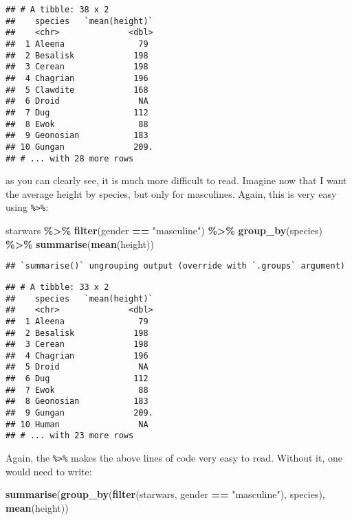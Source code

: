 \documentclass[
]{article}
\newenvironment{Shaded}{\begin{snugshade}}{\end{snugshade}}
\newcommand{\KeywordTok}[1]{\textcolor[rgb]{0.13,0.29,0.53}{\textbf{#1}}}
\newcommand{\NormalTok}[1]{#1}
\newcommand{\OperatorTok}[1]{\textcolor[rgb]{0.81,0.36,0.00}{\textbf{#1}}}
\newcommand{\StringTok}[1]{\textcolor[rgb]{0.31,0.60,0.02}{#1}}
\begin{document}
\begin{verbatim}
## # A tibble: 38 x 2
##    species   `mean(height)`
##    <chr>              <dbl>
##  1 Aleena               79 
##  2 Besalisk            198 
##  3 Cerean              198 
##  4 Chagrian            196 
##  5 Clawdite            168 
##  6 Droid                NA 
##  7 Dug                 112 
##  8 Ewok                 88 
##  9 Geonosian           183 
## 10 Gungan              209.
## # ... with 28 more rows
\end{verbatim}

as you can clearly see, it is much more difficult to read. Imagine now that I want the average height
by species, but only for masculines. Again, this is very easy using \texttt{\%\textgreater{}\%}:

\begin{Shaded}
\begin{Highlighting}[]
\NormalTok{starwars }\OperatorTok{\%\textgreater{}\%}
\StringTok{  }\KeywordTok{filter}\NormalTok{(gender }\OperatorTok{==}\StringTok{ "masculine"}\NormalTok{) }\OperatorTok{\%\textgreater{}\%}
\StringTok{  }\KeywordTok{group\_by}\NormalTok{(species) }\OperatorTok{\%\textgreater{}\%}
\StringTok{  }\KeywordTok{summarise}\NormalTok{(}\KeywordTok{mean}\NormalTok{(height))}
\end{Highlighting}
\end{Shaded}

\begin{verbatim}
## `summarise()` ungrouping output (override with `.groups` argument)
\end{verbatim}

\begin{verbatim}
## # A tibble: 33 x 2
##    species   `mean(height)`
##    <chr>              <dbl>
##  1 Aleena               79 
##  2 Besalisk            198 
##  3 Cerean              198 
##  4 Chagrian            196 
##  5 Droid                NA 
##  6 Dug                 112 
##  7 Ewok                 88 
##  8 Geonosian           183 
##  9 Gungan              209.
## 10 Human                NA 
## # ... with 23 more rows
\end{verbatim}

Again, the \texttt{\%\textgreater{}\%} makes the above lines of code very easy to read. Without it, one would need to write:

\begin{Shaded}
\begin{Highlighting}[]
\KeywordTok{summarise}\NormalTok{(}\KeywordTok{group\_by}\NormalTok{(}\KeywordTok{filter}\NormalTok{(starwars, gender }\OperatorTok{==}\StringTok{ "masculine"}\NormalTok{), species), }\KeywordTok{mean}\NormalTok{(height))}
\end{Highlighting}
\end{Shaded}
\end{document}
